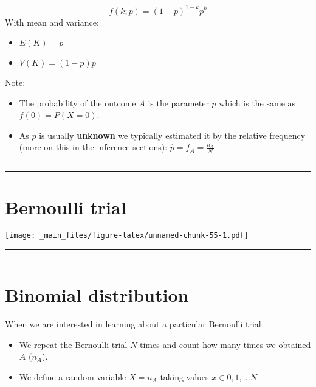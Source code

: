 \documentclass[
]{book}
\begin{document}
\[f(k; p)=(1-p)^{1-k} p^k\]
With mean and variance:

\begin{itemize}
\item
  \(E(K)=p\)
\item
  \(V(K)=(1-p)p\)
\end{itemize}

Note:

\begin{itemize}
\item
  The probability of the outcome \(A\) is the parameter \(p\)
  which is the same as \(f(0)=P(X=0)\).
\item
  As \(p\) is usually \textbf{unknown} we typically estimated it by the relative frequency (more on this in the inference sections): \(\hat{p}=f_A=\frac{n_A}{N}\)
\end{itemize}

\begin{center}\rule{0.5\linewidth}{0.5pt}\end{center}

\begin{center}\rule{0.5\linewidth}{0.5pt}\end{center}

\hypertarget{bernoulli-trial-3}{%
\section{Bernoulli trial}\label{bernoulli-trial-3}}

\texttt{[image: \_main\_files/figure-latex/unnamed-chunk-55-1.pdf]}

\begin{center}\rule{0.5\linewidth}{0.5pt}\end{center}

\begin{center}\rule{0.5\linewidth}{0.5pt}\end{center}

\hypertarget{binomial-distribution}{%
\section{Binomial distribution}\label{binomial-distribution}}

When we are interested in learning about a particular Bernoulli trial

\begin{itemize}
\item
  We repeat the Bernoulli trial \(N\) times and count how many times we obtained \(A\) (\(n_A\)).
\item
  We define a random variable \(X=n_A\) taking values \(x \in {0,1,...N}\)
\end{itemize}
\end{document}
